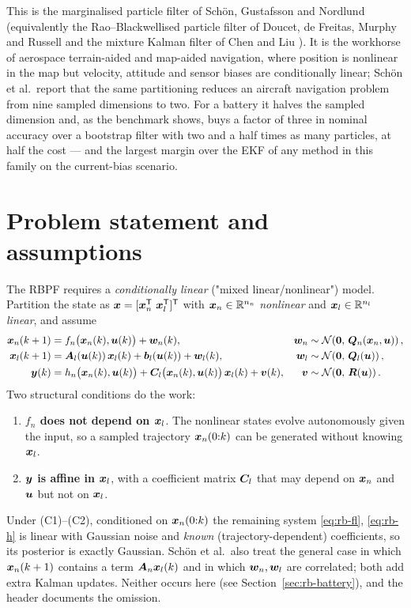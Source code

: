 This is the marginalised particle filter of Schön, Gustafsson and Nordlund
\cite{schon2005marginalized} (equivalently the Rao--Blackwellised particle filter of Doucet, de
Freitas, Murphy and Russell \cite{doucet2000rbpf} and the mixture Kalman filter of Chen and Liu
\cite{chenliu2000mkf}).  It is the workhorse of aerospace terrain-aided and map-aided navigation,
where position is nonlinear in the map but velocity, attitude and sensor biases are conditionally
linear; Schön et al.\ report that the same partitioning reduces an aircraft navigation problem from
nine sampled dimensions to two.  For a battery it halves the sampled dimension and, as the
benchmark shows, buys a factor of three in nominal accuracy over a bootstrap filter with two and a
half times as many particles, at half the cost --- and the largest margin over the EKF of any method
in this family on the current-bias scenario.

\section{Problem statement and assumptions}
The RBPF requires a \emph{conditionally linear} ("mixed linear/nonlinear") model.  Partition the
state as $\bm{x} = [\bm{x}_n^{\mathsf{T}}\ \bm{x}_l^{\mathsf{T}}]^{\mathsf{T}}$ with $\bm{x}_n\in\mathbb{R}^{n_n}$ \emph{nonlinear} and
$\bm{x}_l\in\mathbb{R}^{n_l}$ \emph{linear}, and assume
\begin{align}
  \bm{x}_n(k+1) &= f_n\big(\bm{x}_n(k),\bm{u}(k)\big) + \bm{w}_n(k),
    & \bm{w}_n &\sim \mathcal{N}\!\left(\bm 0,\,\bm{Q}_n(\bm{x}_n,\bm{u})\right), \label{eq:rb-fn}\\
  \bm{x}_l(k+1) &= \bm{A}_l(\bm{u}(k))\,\bm{x}_l(k) + \bm{b}_l(\bm{u}(k)) + \bm{w}_l(k),
    & \bm{w}_l &\sim \mathcal{N}\!\left(\bm 0,\,\bm{Q}_l(\bm{u})\right), \label{eq:rb-fl}\\
  \bm{y}(k) &= h_n\big(\bm{x}_n(k),\bm{u}(k)\big) + \bm{C}_l\big(\bm{x}_n(k),\bm{u}(k)\big)\,\bm{x}_l(k) + \bm{v}(k),
    & \bm{v} &\sim \mathcal{N}\!\left(\bm 0,\,\bm{R}(\bm{u})\right). \label{eq:rb-h}
\end{align}
Two structural conditions do the work:
\begin{enumerate}[label=(C\arabic*),leftmargin=3em]
  \item \textbf{$f_n$ does not depend on $\bm{x}_l$}.  The nonlinear states evolve autonomously given
        the input, so a sampled trajectory $\bm{x}_n(0{:}k)$ can be generated without knowing $\bm{x}_l$.
  \item \textbf{$\bm{y}$ is affine in $\bm{x}_l$}, with a coefficient matrix $\bm{C}_l$ that may depend on
        $\bm{x}_n$ and $\bm{u}$ but not on $\bm{x}_l$.
\end{enumerate}
Under (C1)--(C2), conditioned on $\bm{x}_n(0{:}k)$ the remaining system \eqref{eq:rb-fl},
\eqref{eq:rb-h} is linear with Gaussian noise and \emph{known} (trajectory-dependent) coefficients,
so its posterior is exactly Gaussian.  Schön et al.\ also treat the general case in which
$\bm{x}_n(k+1)$ contains a term $\bm{A}_n\bm{x}_l(k)$ and in which $\bm{w}_n,\bm{w}_l$ are correlated; both add
extra Kalman updates.  Neither occurs here (see Section~\ref{sec:rb-battery}), and the header
documents the omission.

